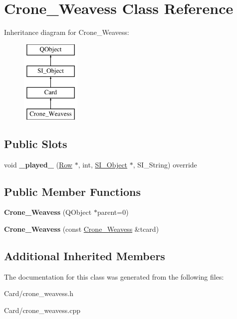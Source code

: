 \hypertarget{class_crone___weavess}{}\section{Crone\+\_\+\+Weavess Class Reference}
\label{class_crone___weavess}
Inheritance diagram for Crone\+\_\+\+Weavess\+:\begin{figure}[H]
\begin{center}
\leavevmode
\includegraphics[height=4.000000cm]{class_crone___weavess}
\end{center}
\end{figure}
\subsection*{Public Slots}
\begin{DoxyCompactItemize}
\item 
\mbox{\label{class_crone___weavess_a52cc4a9d262705d8540cb18a77ee56ed}} 
void {\bfseries \+\_\+played\+\_\+} (\hyperlink{class_card_set}{Row} $\ast$, int, \hyperlink{class_s_i___object}{S\+I\+\_\+\+Object} $\ast$, S\+I\+\_\+\+String) override
\end{DoxyCompactItemize}
\subsection*{Public Member Functions}
\begin{DoxyCompactItemize}
\item 
\mbox{\label{class_crone___weavess_afe404641a4c94b41b23baab59e9d8148}} 
{\bfseries Crone\+\_\+\+Weavess} (Q\+Object $\ast$parent=0)
\item 
\mbox{\label{class_crone___weavess_a82305a9d7dd786b1f49162929cf97f27}} 
{\bfseries Crone\+\_\+\+Weavess} (const \hyperlink{class_crone___weavess}{Crone\+\_\+\+Weavess} \&tcard)
\end{DoxyCompactItemize}
\subsection*{Additional Inherited Members}


The documentation for this class was generated from the following files\+:\begin{DoxyCompactItemize}
\item 
Card/crone\+\_\+weavess.\+h\item 
Card/crone\+\_\+weavess.\+cpp\end{DoxyCompactItemize}
